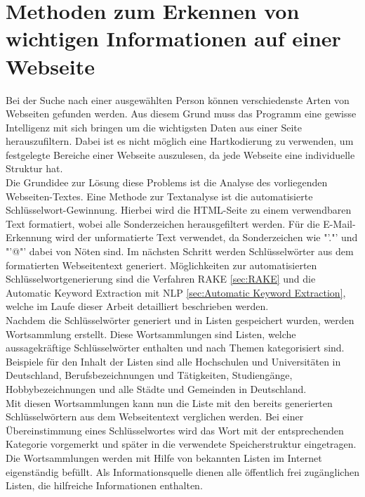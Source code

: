 			

\section{Methoden zum Erkennen von wichtigen Informationen auf einer Webseite}
\label{subsec:ErkennenVonInformation}
Bei der Suche nach einer ausgewählten Person können verschiedenste Arten von Webseiten gefunden werden. Aus diesem Grund muss das Programm eine gewisse Intelligenz mit sich bringen um die wichtigsten Daten aus einer Seite herauszufiltern. Dabei ist es nicht möglich eine Hartkodierung zu verwenden, um festgelegte Bereiche einer Webseite auszulesen, da jede Webseite eine individuelle Struktur hat.\\
Die Grundidee zur Lösung diese Problems ist die Analyse des vorliegenden Webseiten-Textes. Eine Methode zur Textanalyse ist die automatisierte Schlüsselwort-Gewinnung. Hierbei wird die HTML-Seite zu einem verwendbaren Text formatiert, wobei alle Sonderzeichen herausgefiltert werden. Für die E-Mail-Erkennung wird der unformatierte Text verwendet, da Sonderzeichen wie "'."' und "'@"'  dabei von Nöten sind. Im nächsten Schritt werden Schlüsselwörter aus dem formatierten Webseitentext generiert. Möglichkeiten zur automatisierten Schlüsselwortgenerierung sind die Verfahren RAKE \ref{sec:RAKE} und die Automatic Keyword Extraction mit NLP \ref{sec:Automatic Keyword Extraction}, welche im Laufe dieser Arbeit detailliert beschrieben werden.\\
Nachdem die Schlüsselwörter generiert und in Listen gespeichert wurden, werden Wortsammlung erstellt. Diese Wortsammlungen sind Listen, welche aussagekräftige Schlüsselwörter enthalten und nach Themen kategorisiert sind. Beispiele für den Inhalt der Listen sind alle Hochschulen und Universitäten in Deutschland, Berufsbezeichnungen und Tätigkeiten, Studiengänge, Hobbybezeichnungen und alle Städte und Gemeinden in Deutschland.\\
Mit diesen Wortsammlungen kann nun die Liste mit den bereits generierten Schlüsselwörtern aus dem Webseitentext verglichen werden. Bei einer Übereinstimmung eines Schlüsselwortes wird das Wort mit der entsprechenden Kategorie vorgemerkt und später in die verwendete Speicherstruktur eingetragen. \\
Die Wortsammlungen werden mit Hilfe von bekannten Listen im Internet eigenständig befüllt. Als Informationsquelle dienen alle öffentlich frei zugänglichen Listen, die hilfreiche Informationen enthalten.

